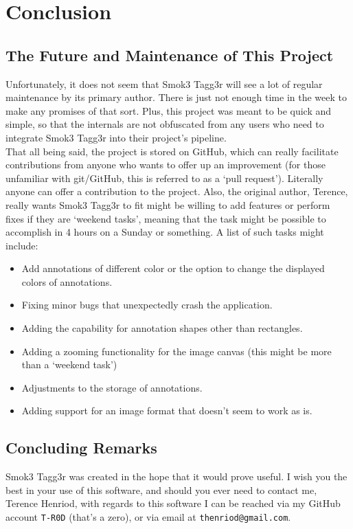 \documentclass{article}
\begin{document}
\section{Conclusion}
\subsection{The Future and Maintenance of This Project}
Unfortunately, it does not seem that Smok3 Tagg3r will see a lot of regular maintenance by its primary author. There is just not enough time in the week to make any promises of that sort. Plus, this project was meant to be quick and simple, so that the internals are not obfuscated from any users who need to integrate Smok3 Tagg3r into their project's pipeline.\\

That all being said, the project is stored on GitHub, which can really facilitate contributions from anyone who wants to offer up an improvement (for those unfamiliar with git/GitHub, this is referred to as a `pull request'). Literally anyone can offer a contribution to the project. Also, the original author, Terence, really wants Smok3 Tagg3r to fit might be willing to add features or perform fixes if they are `weekend tasks', meaning that the task might be possible to accomplish in 4 hours on a Sunday or something. A list of such tasks might include:
\begin{itemize}
  \item Add annotations of different color or the option to change the displayed colors of annotations.
  \item Fixing minor bugs that unexpectedly crash the application.
  \item Adding the capability for annotation shapes other than rectangles.
  \item Adding a zooming functionality for the image canvas (this might be more than a `weekend task')
  \item Adjustments to the storage of annotations.
  \item Adding support for an image format that doesn't seem to work as is.
\end{itemize}

\subsection{Concluding Remarks}
Smok3 Tagg3r was created in the hope that it would prove useful. I wish you the best in your use of this software, and should you ever need to contact me, Terence Henriod, with regards to this software I can be reached via my GitHub account \texttt{T-R0D} (that's a zero), or via email at \texttt{thenriod@gmail.com}.
%
\end{document}
